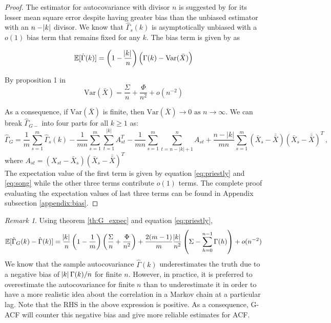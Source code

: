 \documentclass[11pt]{article}
\newcommand{\Var}{\text{Var}}
\theoremstyle{remark}
\newtheorem{remark}{Remark}
\begin{document}
\begin{proof}
 The estimator for autocovariance with divisor $n$ is suggested by \cite{parzen1961approach} for its lesser mean square error despite having greater bias than the unbiased estimator with an $n - \abs{k}$ divisor. 
 We know that $\hat{\Gamma}_s(k)$ is asymptotically unbiased with a $o(1)$ bias term that remains fixed for any $k$. The bias term is given by \cite{priestley1981spectral} as 
 
 \begin{equation} \label{eq:priestly}
     \mathbb{E}[\hat{\Gamma}(k)] = \left(1- \dfrac{\abs{k}}{n}\right)\left(\Gamma(k) - \Var{(\bar{X})}
 \right)
 \end{equation}
 
By proposition 1 in \cite{song1995optimal} 
\begin{equation} \label{eq:song}
\Var(\bar{X}) = \dfrac{\Sigma}{n} + \dfrac{\Phi}{n^2} + o(n^{-2})
\end{equation}

As a consequence, if $\Var(\bar{X})$ is finite, then $\Var(\bar{X}) \to 0 \textrm{ as } n \to \infty$. We can break $\hat{\Gamma}_{G-}$ into four parts for all $k \geq 1$ as:
 \[
 \hat{\Gamma}_{G} =  \dfrac{1}{m}\sum_{s=1}^{m}\hat{\Gamma}_s(k) - \dfrac{1}{mn}\sum_{s=1}^{m}\sum_{t=1}^{|k|}A_{st}^T - \dfrac{1}{mn}\sum_{s=1}^{m}\sum_{t=n-|k|+1}^{n}A_{st} + \dfrac{n-|k|}{mn}\sum_{s=1}^{m}(\bar{X}_s - \bar{\bar{X}})(\bar{X}_s - \bar{\bar{X}})^T\,,
 \]
%
where $A_{st} = (X_{st}-\bar{X}_s)(\bar{X}_s - \bar{\bar{X}})^T$\\
The expectation value of the first term is given by equation \ref{eq:priestly} and \ref{eq:song} while the other three terms contribute $o(1)$ terms. The complete proof evaluating the expectation values of last three terms can be found in Appendix subsection \ref{appendix:bias}.
\end{proof}

\begin{remark} \label{rmrk:exp_G-f_minus_acf}
Using theorem \ref{th:G_expec} and equation \ref{eq:priestly},
\[
\mathbb{E}[\hat{\Gamma}_{G}(k) - \hat{\Gamma}(k)] = \dfrac{\abs{k}}{n}\left(1 - \dfrac{1}{m}\right)\left(\dfrac{\Sigma}{n} + \dfrac{\Phi}{n^2}\right) + \dfrac{2(m-1)}{m}\dfrac{\abs{k}}{n^2} \left(\Sigma - \sum_{h=0}^{n-1}\Gamma(h)\right) + o(n^{-2})
\]
We know that the sample autocovariance $\hat{\Gamma}(k)$ underestimates the truth due to a negative bias of $\abs{k}\Gamma(k)/n$ for finite $n$. However, in practice, it is preferred to overestimate the autocovariance for finite $n$ than to underestimate it in order to have a more realistic idea about the correlation in a Markov chain at a particular lag.  Note that the RHS in the above expression is positive. As a consequence, G-ACF will counter this negative bias and give more reliable estimates for ACF. 

\end{remark}
\end{document}
